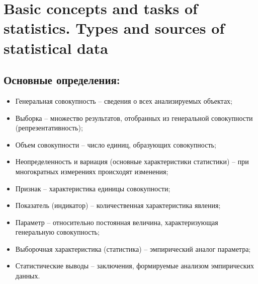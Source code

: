     \section{Basic concepts and tasks of statistics. Types and sources of statistical data}
    \subsection*{Основные определения:}
    \begin{itemize}
        \item Генеральная совокупность -- сведения о всех анализируемых объектах;
        \item Выборка -- множество результатов, отобранных из генеральной совокупности (репрезентативность);
        \item Объем совокупности -- число единиц, образующих совокупность;
        \item Неопределенность и вариация (основные характеристики статистики) -- при многократных измерениях происходят изменения;
        \item Признак -- характеристика единицы совокупности;
        \item Показатель (индикатор) -- количественная характеристика явления;
        \item Параметр -- относительно постоянная величина, характеризующая генеральную совокупность;
        \item Выборочная характеристика (статистика) -- эмпирический аналог параметра;
        \item Статистические выводы -- заключения, формируемые анализом эмпирических данных.
    \end{itemize}
